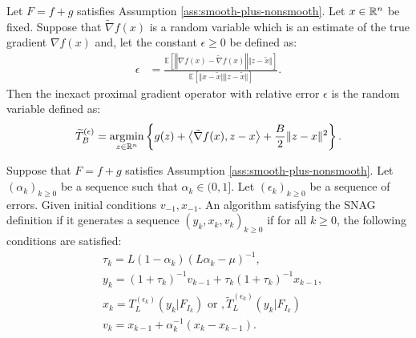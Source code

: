 \documentclass[12pt]{article}
\newcommand{\expect}{\ensuremath{\mathbb E}}
\begin{document}
    \begin{definition}
        Let $F = f + g$ satisfies Assumption \ref{ass:smooth-plus-nonsmooth}. 
        Let $x \in \mathbb R^n$ be fixed. 
        Suppose that $\tilde \nabla f(x)$ is a random variable which is an estimate of the true gradient $\nabla f(x)$ and, let the constant $\epsilon \ge 0$ be defined as: 
        \begin{align*}
            \epsilon &=
            \frac{
            \expect \left[
                \left\Vert \nabla f(x) - \tilde \nabla f(x) \right\Vert \Vert z - \tilde x\Vert
            \right]
            }{\expect \left[
                \Vert x - \tilde x\Vert\Vert z - \tilde x\Vert
            \right]}. 
        \end{align*}
        Then the inexact proximal gradient operator with relative error $\epsilon$ is the random variable defined as: 
        \begin{align*}
            \widetilde T_B^{(\epsilon)} = \mathop{\rm argmin}\limits_{z \in \mathbb R^n}\left\lbrace
                g(z) + \left\langle \tilde \nabla f(x), z - x\right\rangle
                + \frac{B}{2}\Vert z - x\Vert^2
            \right\rbrace. 
        \end{align*}
    \end{definition}
    \begin{definition}\label{def:SNAG}
        Suppose that $F = f + g$ satisfies Assumption \ref{ass:smooth-plus-nonsmooth}. 
        Let $(\alpha_k)_{k \ge 0}$ be a sequence such that $\alpha_k \in (0, 1]$. 
        Let $(\epsilon_k)_{k \ge 0}$ be a sequence of errors. 
        Given initial conditions $v_{-1}, x_{- 1}$. 
        An algorithm satisfying the SNAG definition if it generates a sequence $(y_k, x_k, v_k)_{k \ge 0}$ if for all $k \ge 0$, the following conditions are satisfied: 
        \begin{align*}
            & \tau_k = L(1 - \alpha_k)\left(L \alpha_k - \mu\right)^{-1}, \\
            & y_k = (1 + \tau_k)^{-1}v_{k - 1} + \tau_k(1 + \tau_k)^{-1}x_{k - 1}, \\
            & x_k =  T_{L}^{(\epsilon_k)}(y_k | F_{I_k}) \text{ or }, \widetilde T_{L}^{(\epsilon_k)}(y_k | F_{I_k})\\
            & v_k = x_{k - 1} + \alpha_k^{-1}(x_k - x_{k - 1}).
        \end{align*}
    \end{definition}
\end{document}
